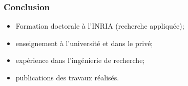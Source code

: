 \documentclass[compress,dvips,xcolor={dvipsnames},t]{beamer}
\begin{document}
\begin{frame}
\frametitle{Conclusion}

\begin{itemize}

  \item Formation doctorale à l'INRIA (recherche appliquée);

  \item enseignement à l'université et dans le privé;

  \item expérience dans l'ingénierie de recherche;

  \item publications des travaux réalisés.

\end{itemize}

\end{frame}
\end{document}

